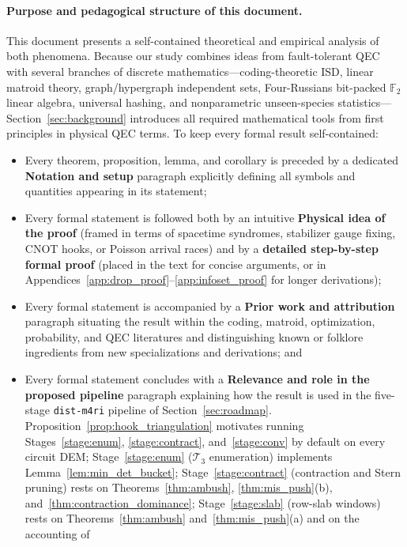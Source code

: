 \documentclass[12pt]{article}
\theoremstyle{definition}
\newcommand{\Ftwo}{\mathbb{F}_2}
\newcommand{\Tc}{\mathcal{T}_3}
\newcommand{\ttt}[1]{\texttt{#1}}
\begin{document}
\paragraph{Purpose and pedagogical structure of this document.}
This document presents a self-contained theoretical and empirical analysis of both phenomena. Because our study
combines ideas from fault-tolerant QEC with several branches of discrete mathematics---coding-theoretic ISD, linear
matroid theory, graph/hypergraph independent sets, Four-Russians bit-packed $\Ftwo$ linear algebra, universal
hashing, and nonparametric unseen-species statistics---Section~\ref{sec:background} introduces all required
mathematical tools from first principles in physical QEC terms. To keep every formal result self-contained:
\begin{itemize}
  \item Every theorem, proposition, lemma, and corollary is preceded by a dedicated \textbf{Notation and setup}
    paragraph explicitly defining all symbols and quantities appearing in its statement;
  \item Every formal statement is followed both by an intuitive \textbf{Physical idea of the proof} (framed in
    terms of spacetime syndromes, stabilizer gauge fixing, CNOT hooks, or Poisson arrival races) and by a
    \textbf{detailed step-by-step formal proof} (placed in the text for concise arguments, or in
    Appendices~\ref{app:drop_proof}--\ref{app:infoset_proof} for longer derivations);
  \item Every formal statement is accompanied by a \textbf{Prior work and attribution} paragraph situating the
    result within the coding, matroid, optimization, probability, and QEC literatures and distinguishing known or
    folklore ingredients from new specializations and derivations; and
  \item Every formal statement concludes with a \textbf{Relevance and role in the proposed pipeline} paragraph
    explaining how the result is used in the five-stage \ttt{dist-m4ri} pipeline of Section~\ref{sec:roadmap}.
    Proposition~\ref{prop:hook_triangulation} motivates running Stages~\ref{stage:enum}, \ref{stage:contract},
    and~\ref{stage:conv} by default on every circuit DEM; Stage~\ref{stage:enum} ($\Tc$ enumeration) implements
    Lemma~\ref{lem:min_det_bucket}; Stage~\ref{stage:contract} (contraction and Stern pruning) rests on
    Theorems~\ref{thm:ambush}, \ref{thm:mis_push}(b), and~\ref{thm:contraction_dominance}; Stage~\ref{stage:slab}
    (row-slab windows) rests on Theorems~\ref{thm:ambush} and~\ref{thm:mis_push}(a) and on the accounting of

\end{itemize}
\end{document}
